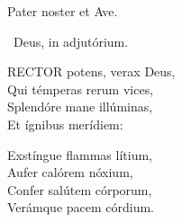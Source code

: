 
Pater noster et Ave.

\V\ Deus, in adjutórium.


\lettrine[lines=2]{R}{ECTOR} potens, verax Deus,\\
Qui témperas rerum vices,\\
Splendóre mane illúminas,\\
Et ígnibus merídiem:

Exstíngue flammas lítium,\\
Aufer calórem nóxium,\\
Confer salútem córporum,\\
Verámque pacem córdium.

